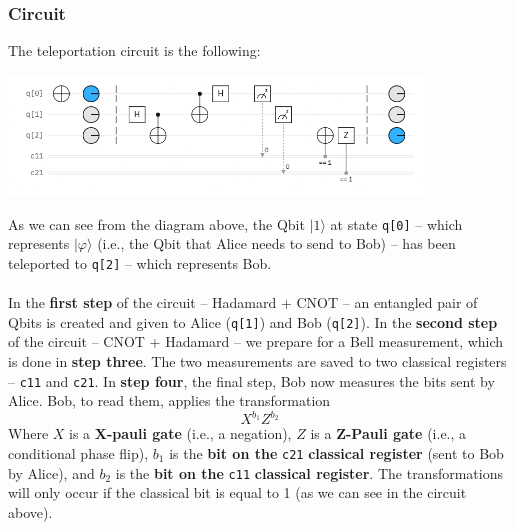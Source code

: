 \documentclass{article}
\begin{document}
\pagebreak
\subsubsection{Circuit}
The teleportation circuit is the following:
\begin{center}
	\includegraphics[width=11cm]{assets/teleportation_circuit.png}
\end{center}
As we can see from the diagram above, the Qbit $|1\rangle$ at state \verb|q[0]| -- which represents $|\varphi\rangle$ (i.e., the Qbit that Alice needs to send to Bob) -- has been teleported to \verb|q[2]| -- which represents Bob. \\ \\
In the \textbf{first step} of the circuit -- Hadamard + CNOT -- an entangled pair of Qbits is created and given to Alice (\verb|q[1]|) and Bob (\verb|q[2]|). In the \textbf{second step} of the circuit -- CNOT + Hadamard -- we prepare for a Bell measurement, which is done in \textbf{step three}. The two measurements are saved to two classical registers -- \verb|c11| and \verb|c21|. In \textbf{step four}, the final step, Bob now measures the bits sent by Alice. Bob, to read them, applies the transformation
\[ X^{b_1}Z^{b_2} \]
Where $X$ is a \textbf{X-pauli gate} (i.e., a negation), $Z$ is a \textbf{Z-Pauli gate} (i.e., a conditional phase flip), $b_1$ is the \textbf{bit on the} \verb|c21| \textbf{classical register} (sent to Bob by Alice), and $b_2$ is the \textbf{bit on the} \verb|c11| \textbf{classical register}. The transformations will only occur if the classical bit is equal to 1 (as we can see in the circuit above).
\end{document}
